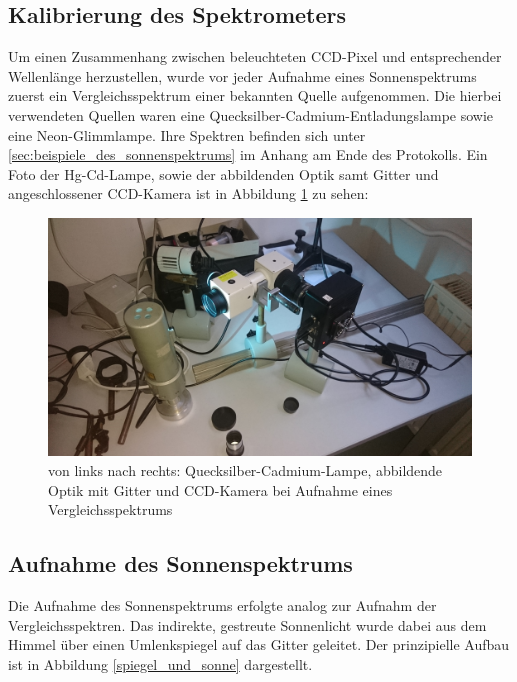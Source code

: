 

	\subsection{Kalibrierung des Spektrometers} %
	\label{sub:kalibrierung_des_spektrometers}

		Um einen Zusammenhang zwischen beleuchteten CCD-Pixel und entsprechender Wellenlänge herzustellen, wurde vor jeder Aufnahme eines Sonnenspektrums zuerst ein Vergleichsspektrum einer bekannten Quelle aufgenommen.
		Die hierbei verwendeten Quellen waren eine Quecksilber-Cadmium-Entladungslampe sowie eine Neon-Glimmlampe.
		Ihre Spektren befinden sich unter \ref{sec:beispiele_des_sonnenspektrums} im Anhang am Ende des Protokolls.
		Ein Foto der Hg-Cd-Lampe, sowie der abbildenden Optik samt Gitter und angeschlossener CCD-Kamera ist in Abbildung \ref{hg_cd_lampe} zu sehen:

		\begin{figure}
			\center
			\includegraphics[scale=0.085]{messwerte/Handybilder/DSC_0675.JPG}
			\caption{von links nach rechts: Quecksilber-Cadmium-Lampe, abbildende Optik mit Gitter und CCD-Kamera bei Aufnahme eines Vergleichsspektrums}
			\label{hg_cd_lampe}
		\end{figure}


		\subsection{Aufnahme des Sonnenspektrums} %
		\label{sub:aufnahme_des_sonnenspektrums}

			Die Aufnahme des Sonnenspektrums erfolgte analog zur Aufnahm der Vergleichsspektren.
			Das indirekte, gestreute Sonnenlicht wurde dabei aus dem Himmel über einen Umlenkspiegel auf das Gitter geleitet.
			Der prinzipielle Aufbau ist in Abbildung \ref{spiegel_und_sonne} dargestellt.

